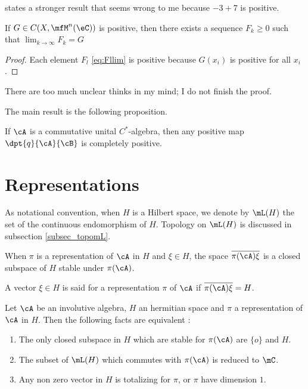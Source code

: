 \begin{probleme}
  \cite{Landsman} states a stronger result that seems wrong to me because \( -3+7\) is positive.
\end{probleme}

\begin{proposition}
If $G\in C(X,\mfM^n(\eC))$ is positive, then there exists a sequence $F_k\geq 0$ such that $\lim_{k\to\infty}F_k=G$
\end{proposition}

\begin{proof}
Each element $F_l$ \eqref{eq:Fllim} is positive because  $G(x_i)$ is positive for all $x_i$.
\end{proof}

\begin{probleme}
    There are too much unclear thinks in my mind; I do not finish the proof.
\end{probleme}

The main result is the following proposition.

\begin{proposition}
If $\cA$ is a commutative unital $C^*$-algebra, then any positive map $\dpt{ q }{ \cA }{ \cB }$ is completely positive.
\end{proposition}


\section{Representations}

As notational convention, when $H$ is a Hilbert space, we denote by $\mL(H)$ the set of the continuous endomorphism of $H$. Topology on $\mL(H)$ is discussed in subsection \ref{subsec_topomL}.

When $\pi$ is a representation of $\cA$ in $H$ and $\xi\in H$, the space $\overline{ \pi(\cA)\xi }$ is a closed subspace of $H$ stable under $\pi(\cA)$.

\begin{definition}
A vector $\xi\in H$ is said  for a
representation $\pi$ of $\cA$ if $\overline{ \pi(\cA)\xi }=H$.
\end{definition}

\begin{proposition}
Let $\cA$ be an involutive algebra, $H$ an hermitian space and $\pi$ a representation of $\cA$ in $H$. Then the following facts are equivalent 
:
\begin{enumerate}
\item The only closed subspace in $H$ which are stable for $\pi(\cA)$ 
are $\{o\}$ and $H$.
\item The subset of $\mL(H)$ which commutes with $\pi(\cA)$ is reduced 
to $\mC$.
\item Any non zero vector in $H$ is totalizing for $\pi$, or $\pi$ have 
dimension $1$.
\end{enumerate}
 \label{prop:reprez_topo}
\end{proposition}

